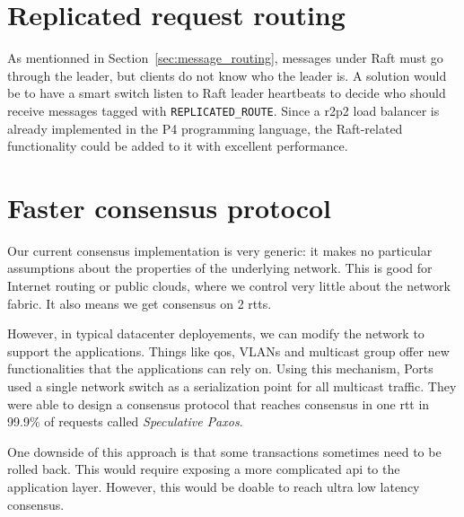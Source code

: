 \section{Replicated request routing}

As mentionned in Section~\ref{sec:message_routing}, messages under Raft must go through the leader, but clients do not know who the leader is.
A solution would be to have a smart switch listen to Raft leader heartbeats to decide who should receive messages tagged with \texttt{REPLICATED\_ROUTE}.
Since a \gls{r2p2} load balancer is already implemented in the P4 programming language\cite{r2p2}, the Raft-related functionality could be added to it with excellent performance.


\section{Faster consensus protocol}

Our current consensus implementation is very generic: it makes no particular assumptions about the properties of the underlying network.
This is good for Internet routing or public clouds, where we control very little about the network fabric.
It also means we get consensus on 2 \glspl{rtt}.

However, in typical datacenter deployements, we can modify the network to support the applications.
Things like \gls{qos}, VLANs and multicast group offer new functionalities that the applications can rely on.
Using this mechanism, Ports \etal used a single network switch as a serialization point for all multicast traffic.
They were able to design a consensus protocol that reaches consensus in one \gls{rtt} in 99.9\% of requests called \emph{Speculative Paxos}\cite{specpaxos}.

One downside of this approach is that some transactions sometimes need to be rolled back.
This would require exposing a more complicated \gls{api} to the application layer.
However, this would be doable to reach ultra low latency consensus.

